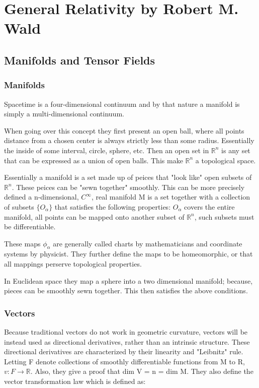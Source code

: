 \section{General Relativity by Robert M. Wald}

\subsection{Manifolds and Tensor Fields}
\subsubsection{Manifolds}
Spacetime is a four-dimensional continuum and by that nature a manifold is simply a multi-dimensional continuum.

When going over this concept they first present an open ball, where  all points distance from a chosen center is always strictly less than some radius. Essentially the inside of some interval, circle, sphere, etc. Then an open set in $\mathbb{R}^n$ is any set that can be expressed as a union of open balls. This make $\mathbb{R}^n$ a topological space.

Essentially a manifold is a set made up of peices that "look like" open subsets of $\mathbb{R}^n$. These peices can be "sewn together" smoothly. This can be more precisely defined a n-dimensional, $C^{\infty}$, real manifold M is a set together with a collection of subsets $\{ O_\alpha \}$ that satisfies the following properties: $O_\alpha$ covers the entire manifold, all points can be mapped onto another subset of $\mathbb{R}^n$, such subsets must be differentiable.

These maps $\phi_\alpha$ are generally called charts by mathematicians and coordinate systems by physicist. They further define the maps to be homeomorphic, or that all mappings perserve topological properties.

In Euclidean space they map a sphere into a two dimensional manifold; because, pieces can be smoothly sewn together. This then satisfies the above conditions.

\subsubsection{Vectors}

Because traditional vectors do not work in geometric curvature, vectors will be instead used as directional derivatives, rather than an intrinsic structure. These directional derivatives are characterized by their linearity and "Leibnitz" rule. Letting F denote collections of smoothly differentiable functions from M to R, $v: F \to \mathbb{R}$. Also, they give a proof that dim V = n = dim M. They also define the vector transformation law which is defined as:

